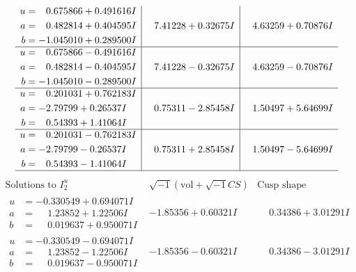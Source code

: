 \documentclass[1p]{elsarticle_modified}
\theoremstyle{definition}
\newcommand{\I}{\sqrt{-1}}
\begin{document}
$$\begin{array}{c|c|c}
\begin{aligned}
u &= \phantom{-}0.675866 + 0.491616 I \\
a &= \phantom{-}0.482814 + 0.404595 I \\
b &= -1.045010 + 0.289500 I\end{aligned}
 & \phantom{-}7.41228 + 0.32675 I & \phantom{-}4.63259 + 0.70876 I \\ \hline\begin{aligned}
u &= \phantom{-}0.675866 - 0.491616 I \\
a &= \phantom{-}0.482814 - 0.404595 I \\
b &= -1.045010 - 0.289500 I\end{aligned}
 & \phantom{-}7.41228 - 0.32675 I & \phantom{-}4.63259 - 0.70876 I \\ \hline\begin{aligned}
u &= \phantom{-}0.201031 + 0.762183 I \\
a &= -2.79799 + 0.26537 I \\
b &= \phantom{-}0.54393 + 1.41064 I\end{aligned}
 & \phantom{-}0.75311 - 2.85458 I & \phantom{-}1.50497 + 5.64699 I \\ \hline\begin{aligned}
u &= \phantom{-}0.201031 - 0.762183 I \\
a &= -2.79799 - 0.26537 I \\
b &= \phantom{-}0.54393 - 1.41064 I\end{aligned}
 & \phantom{-}0.75311 + 2.85458 I & \phantom{-}1.50497 - 5.64699 I\\
 \hline 
 \end{array}$$\newpage$$\begin{array}{c|c|c}  
\text{Solutions to }I^u_{2}& \I (\text{vol} + \sqrt{-1}CS) & \text{Cusp shape}\\
 \hline 
\begin{aligned}
u &= -0.330549 + 0.694071 I \\
a &= \phantom{-}1.23852 + 1.22506 I \\
b &= \phantom{-}0.019637 + 0.950071 I\end{aligned}
 & -1.85356 + 0.60321 I & \phantom{-}0.34386 + 3.01291 I \\ \hline\begin{aligned}
u &= -0.330549 - 0.694071 I \\
a &= \phantom{-}1.23852 - 1.22506 I \\
b &= \phantom{-}0.019637 - 0.950071 I\end{aligned}
 & -1.85356 - 0.60321 I & \phantom{-}0.34386 - 3.01291 I \\ \hline\begin{aligned}

\end{aligned}
\end{array}$$
\end{document}
